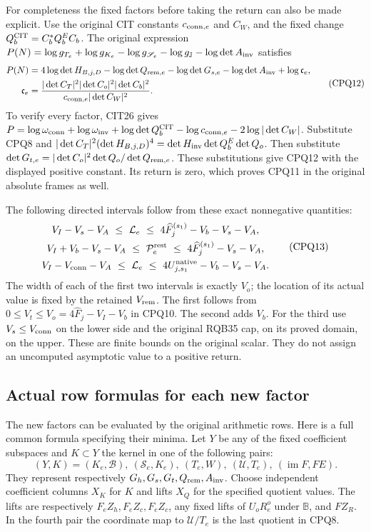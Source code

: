 \documentclass[11pt,a4paper]{article}
\begin{document}
For completeness the fixed factors before taking the return can
also be made explicit. Use the original CIT constants
$c_{{\rm conn},e}$ and $C_W$, and the fixed change
$Q_b^{\rm CIT}=C_b^*Q_b^EC_b$. The original expression
$P(N)=\log g_{T_e}+\log g_{K_e}-\log g_{\mathscr S_e}
-\log g_{\mathbb J}-\log\det A_{\rm inv}$ satisfies
\[
 \begin{split}
 P(N)={}&4\log\det H_{B,j,D}
  -\log\det Q_{{\rm rem},e}-\log\det G_{s,e}
  -\log\det A_{\rm inv}+\log\mathfrak c_e,\\
 \mathfrak c_e={}&
 \frac{|\det C_T|^2|\det C_o|^2|\det C_b|^2}
      {c_{{\rm conn},e}|\det C_W|^2}.
 \end{split}\tag{CPQ12}
\]
To verify every factor, CIT26 gives
$P=\log\omega_{\rm conn}+\log\omega_{\rm inv}
+\log\det Q_b^{\rm CIT}-\log c_{{\rm conn},e}
-2\log|\det C_W|$. Substitute CPQ8 and
$|\det C_T|^2(\det H_{B,j,D})^4
=\det H_{\rm inv}\det Q_b^E\det Q_o$.
Then substitute $\det G_{t,e}=|\det C_o|^2\det Q_o/
\det Q_{{\rm rem},e}$. These substitutions give CPQ12
with the displayed positive constant. Its return is zero,
which proves CPQ11 in the original absolute frames as well.

The following directed intervals follow from these exact
nonnegative quantities:
\[
 \begin{gathered}
 V_I-V_s-V_A\ \le\ \mathcal L_e
     \ \le\ 4\widehat F_j^{(s_1)}-V_b-V_s-V_A,\\
 V_I+V_b-V_s-V_A\ \le\ \mathcal P_e^{\rm rest}
     \ \le\ 4\widehat F_j^{(s_1)}-V_s-V_A,\\
 V_I-V_{\rm conn}-V_A\ \le\ \mathcal L_e
     \ \le\ 4U_{j,s_1}^{\rm native}-V_b-V_s-V_A .
 \end{gathered}\tag{CPQ13}
\]
The width of each of the first two intervals is exactly $V_o$;
the location of its actual value is fixed by the retained
$V_{\rm rem}$. The first follows from
$0\le V_t\le V_o=4\widehat F_j-V_I-V_b$ in CPQ10.
The second adds $V_b$. For the third use $V_s\le V_{\rm conn}$
on the lower side and the original RQB35 cap, on its proved
domain, on the upper. These are finite bounds on the original
scalar. They do not assign an uncomputed asymptotic value to a
positive return.

\subsection{Actual row formulas for each new factor}
The new factors can be evaluated by the original arithmetic rows.
Here is a full common formula specifying their minima. Let $Y$
be any of the fixed coefficient subspaces and $K\subset Y$ the
kernel in one of the following pairs:
\[
 (Y,K)=(K_e,\mathscr B),\ (\mathscr S_e,K_e),\ (T_e,W),\
 (\mathcal U,T_e),\ (\operatorname{im}F,FE).
 \tag{CPQ14}
\]
They represent respectively $G_h,G_s,G_t,Q_{\rm rem},A_{\rm inv}$.
Choose independent coefficient columns $X_K$ for $K$ and lifts
$X_Q$ for the specified quotient values. The lifts are respectively
$F_eZ_h,F_eZ_c,F_eZ_c$, any fixed lifts of $U_oR_e^o$ under
$\mathbb B$, and $FZ_R$. In the fourth pair the coordinate map
to $\mathcal U/T_e$ is the last quotient in CPQ8.
\end{document}
